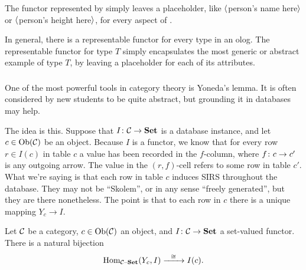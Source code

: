 \documentclass[CT4S-EN-RU]{subfiles}
\begin{document}
\begin{sloganENG}
The functor represented by  simply leaves a placeholder, like $\langle$person's name here$\rangle$ or $\langle$person's height here$\rangle$, for every aspect of . 

In general, there is a representable functor for every type in an olog. The representable functor for type $T$ simply encapsulates the most generic or abstract example of type $T$, by leaving a placeholder for each of its attributes.
\end{sloganENG}

\begin{sloganRUS}
\end{sloganRUS}


\subsubsection{}\label{sec:yoneda}

\begin{blockENG}
One of the most powerful tools in category theory is Yoneda's lemma. It is often considered by new students to be quite abstract, but grounding it in databases may help.
\end{blockENG}

\begin{blockRUS}
\end{blockRUS}

\begin{blockENG}
The idea is this. Suppose that $I\colon\mathcal{C}\rightarrow{\bf Set}$ is a database instance, and let $c\in\textnormal{Ob}(\mathcal{C})$ be an object. Because $I$ is a functor, we know that for every row $r\in I(c)$ in table $c$ a value has been recorded in the $f$-column, where $f\colon c\rightarrow c'$ is any outgoing arrow. The value in the $(r,f)$-cell refers to some row in table $c'$. What we're saying is that each row in table $c$ induces SIRS throughout the database. They may not be “Skolem”, or in any sense “freely generated”, but they are there nonetheless. The point is that to each row in $c$ there is a unique mapping $Y_c\to I$. 
\end{blockENG}

\begin{blockRUS}
\end{blockRUS}

\begin{lemmaENG}\label{lemma:Yoneda}
Let $\mathcal{C}$ be a category, $c\in\textnormal{Ob}(\mathcal{C})$ an object, and $I\colon\mathcal{C}\rightarrow{\bf Set}$ a set-valued functor. There is a natural bijection $$\textnormal{Hom}_{\mathcal{C}{\text \textendash}{\bf Set}}(Y_c,I)\xrightarrow{\ \ \cong\ \ }I(c).$$
\end{lemmaENG}
\end{document}
